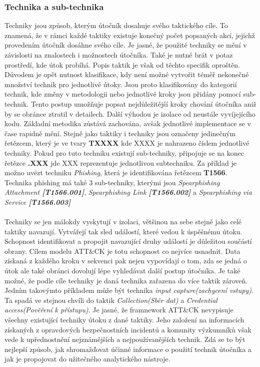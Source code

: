 \subsubsection{Technika a sub-technika}
Techniky jsou způsob, kterým útočník dosahuje svého taktického cíle.
To znamená, že v rámci každé taktiky existuje konečný počet popsaných akcí, jejichž provedením útočník dosáhne svého cíle.
Je jasné, že použité techniky se mění v závislosti na znalostech i možnostech útočníka.
Také je nutné brát v potaz prostředí, kde útok probíhá.
Popis taktik je však od těchto specifik oproštěn.
Důvodem je opět nutnost klasifikace, kdy není možné vytvořit téměř nekonečné množství technik pro jednotlivé útoky.
Jsou proto klasifikovány do kategorií technik, kde změny v metodologii nebo jednotlivé kroky jsou přidány pomocí sub-technik.
Tento postup umožňuje popsat nejdůležitější kroky chování útočníka aniž by se obránce ztratil v detailech.
Další výhodou je izolace od neustále vyvíjejícího kodu.
Základní metodika zůstává zachována, avšak jednotlivé implementace se v čase rapidně mění.
Stejně jako taktiky i techniky jsou označeny jedinečným řetězcem, který je ve tvary \textbf{TXXXX} kde XXXX je nahrazeno číslem jednotlivé techniky.
Pokud pro tuto techniku existují sub-techniky, připojuje se na konec řetězce \textbf{.XXX} jde XXX reprezentuje jednotlivou subtechniku.
Za příklad je možno uvézt techniku \textit{Phishing}, která je identifikována řetězcem \textbf{T1566}.
Technika phishing má také 3 sub-techniky, kterými jsou \textit{Spearphishing Attachment \textbf{[T1566.001]}}, \textit{Spearphishing Link \textbf{[T1566.002]}} a \textit{Spearphishing via Service \textbf{[T1566.003]}}


\paragraph{}
Techniky se jen málokdy vyskytují v izolaci, většinou na sebe stejně jako celé taktiky navazují.
Vytvářejí tak sled událostí, které vedou k úspěšnému útoku.
Schopnost identifikovat a propojit navazující druhy událostí je důležitou součástí obrany.
Cílem modelu ATT\&CK je totu schopnost co nejvíce usnadnit.
Data získaná z každého kroku v sekvenci pak nejen vypovídají o tom, zda se jedná o útok ale také obránci dovolují lépe vyhledávat další postup útočníka.
Je také možné, že podle cíle techniky je daná technika zařazena do více taktik zároveň.
Jedním takovýmto příkladem může být technika \textit{input capture(zachycení vstupy)}.
Ta spadá ve stejnou chvíli do taktik \textit{Collection(Sběr dat)} a \textit{Credential access(Pověření k přístupu)}.
Je jasné, že framnework ATT\&CK nevypisuje všechny existující techniky útoku z dané taktiky.
Jeho založení na informacích získaných z opravdových bezpečnostních incidentů a komunity výzkumníků však vede k upřednostnění nejznámějších a nejpoužívanějších technik.
Zdá se to být nejlepší způsob, jak shromažďovat účinné informace o použití technik útočníka a jak je propojovat do užitečného analytického nástroje.\cite{Mitre_finding_cyber_threats, mitre_attack_framework}


